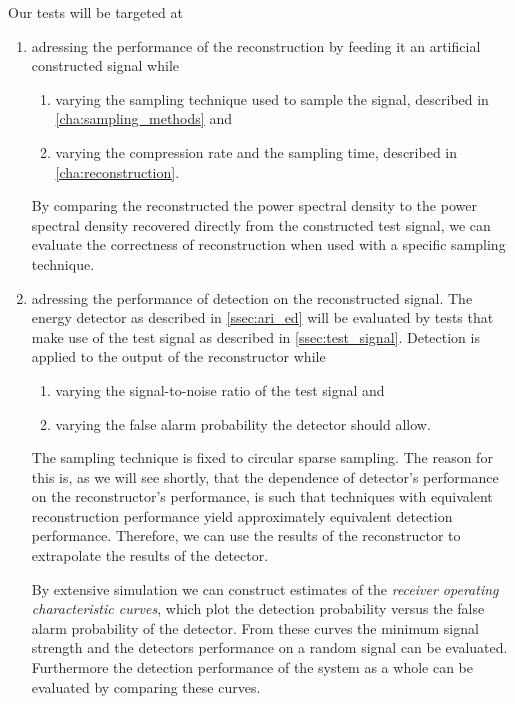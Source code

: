\documentclass[a4paper, openany, oneside]{memoir}
\begin{document}
Our tests will be targeted at
\begin{enumerate}
	\item adressing the performance of the reconstruction by feeding it an artificial constructed signal while
	\begin{enumerate}
		\item varying the sampling technique used to sample the signal, described in \cref{cha:sampling_methods} and
		\item varying the compression rate and the sampling time, described in \cref{cha:reconstruction}.
	\end{enumerate}
	By comparing the reconstructed the power spectral density to the power spectral density recovered directly from the constructed test signal, we can evaluate the correctness of reconstruction when used with a specific sampling technique.
	\item adressing the performance of detection on the reconstructed signal. The energy detector as described in \cref{ssec:ari_ed} will be evaluated by tests that make use of the test signal as described in \cref{ssec:test_signal}. 
	Detection is applied to the output of the reconstructor while	
	\begin{enumerate}
		\item varying the signal-to-noise ratio of the test signal and
		\item varying the false alarm probability the detector 
		should allow.
	\end{enumerate}

	The sampling technique is fixed to circular sparse sampling. The reason for this is, as we will see shortly, that the dependence of detector's performance on the reconstructor's performance, is such that techniques with equivalent reconstruction performance yield approximately equivalent detection performance. Therefore, we can use the results of the reconstructor to extrapolate the results of the detector.

	By extensive simulation we can construct estimates of the \emph{receiver operating characteristic curves}, which plot the detection probability versus the false alarm probability of the detector. From these curves the minimum signal strength and the detectors performance on a random signal can be evaluated. Furthermore the detection performance of the system as a whole can be evaluated by comparing these curves.
	\end{enumerate}
\end{document}
